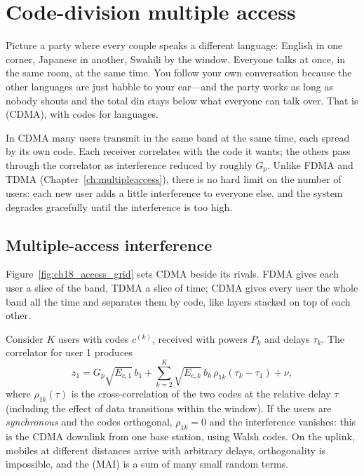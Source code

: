 \section{Code-division multiple access}
\label{sec:ch18:cdma}

Picture a party where every couple speaks a different language: English in one corner, Japanese
in another, Swahili by the window. Everyone talks at once, in the same room, at the same time.
You follow your own conversation because the other languages are just babble to your ear---and
the party works as long as nobody shouts and the total din stays below what everyone can talk
over. That is  (CDMA), with codes for languages.

In CDMA many users transmit in the same band at the same time, each spread by its own code. Each
receiver correlates with the code it wants; the others pass through the correlator as
interference reduced by roughly $G_p$. Unlike FDMA and TDMA (Chapter~\ref{ch:multipleaccess}),
there is no hard limit on the number of users: each new user adds a little interference to
everyone else, and the system degrades gracefully until the interference is too high.

\subsection{Multiple-access interference}
Figure~\ref{fig:ch18_access_grid} sets CDMA beside its rivals. FDMA gives each user a slice of
the band, TDMA a slice of time; CDMA gives every user the whole band all the time and separates
them by code, like layers stacked on top of each other.


Consider $K$ users with codes $c^{(k)}$, received with powers $P_k$ and delays $\tau_k$. The
correlator for user 1 produces
\begin{equation}
z_1=G_p\sqrt{E_{c,1}}\,b_1+\sum_{k=2}^K\sqrt{E_{c,k}}\,b_k\,\rho_{1k}(\tau_k-\tau_1)+\nu,
\end{equation}
where $\rho_{1k}(\tau)$ is the cross-correlation of the two codes at the relative delay $\tau$
(including the effect of data transitions within the window). If the users are
\emph{synchronous} and the codes orthogonal, $\rho_{1k}=0$ and the interference vanishes:
this is the CDMA downlink from one base station, using Walsh codes. On the uplink, mobiles
at different distances arrive with arbitrary delays, orthogonality is impossible, and the
 (MAI) is a sum of many small random terms.

